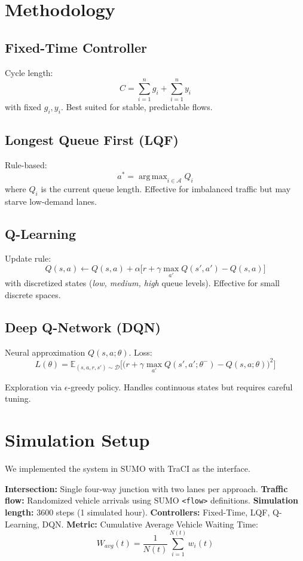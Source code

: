 \documentclass[conference]{IEEEtran}
\DeclareMathOperator*{\argmax}{arg\,max}
\newcommand{\E}{\mathbb{E}}
\begin{document}
\section{Methodology}
\subsection{Fixed-Time Controller}
Cycle length:
\[
C = \sum_{i=1}^{n} g_i + \sum_{i=1}^{n} y_i
\]
with fixed $g_i, y_i$. Best suited for stable, predictable flows.

\subsection{Longest Queue First (LQF)}
Rule-based:
\[
a^* = \argmax_{i \in \mathcal{A}} Q_i
\]
where $Q_i$ is the current queue length. Effective for imbalanced traffic but may starve low-demand lanes.

\subsection{Q-Learning}
Update rule:
\[
Q(s,a) \leftarrow Q(s,a) + \alpha \big[ r + \gamma \max_{a'} Q(s',a') - Q(s,a) \big]
\]
with discretized states (\emph{low, medium, high} queue levels). Effective for small discrete spaces.

\subsection{Deep Q-Network (DQN)}
Neural approximation $Q(s,a;\theta)$. Loss:
\[
L(\theta) = \E_{(s,a,r,s') \sim \mathcal{D}} 
\Big[ \big( r + \gamma \max_{a'} Q(s',a';\theta^-) - Q(s,a;\theta) \big)^2 \Big]
\]

Exploration via $\epsilon$-greedy policy. Handles continuous states but requires careful tuning.

\section{Simulation Setup}
We implemented the system in SUMO with TraCI as the interface.  

\textbf{Intersection:} Single four-way junction with two lanes per approach.  
\textbf{Traffic flow:} Randomized vehicle arrivals using SUMO \texttt{<flow>} definitions.  
\textbf{Simulation length:} 3600 steps (1 simulated hour).  
\textbf{Controllers:} Fixed-Time, LQF, Q-Learning, DQN.  
\textbf{Metric:} Cumulative Average Vehicle Waiting Time:
\[
W_{avg}(t) = \frac{1}{N(t)} \sum_{i=1}^{N(t)} w_i(t)
\]
\end{document}
